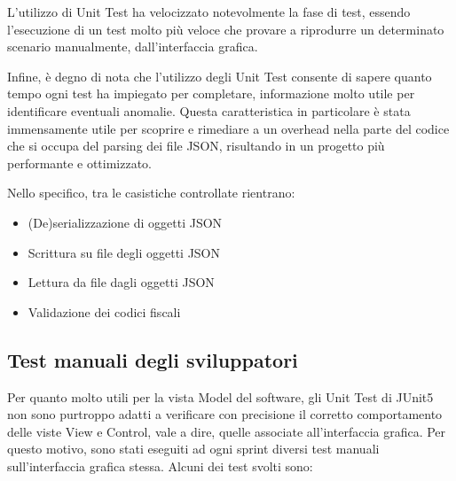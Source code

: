 \documentclass{article}
\begin{document}
L'utilizzo di Unit Test ha velocizzato notevolmente la fase di test, essendo l'esecuzione di un test molto più veloce che provare a riprodurre un determinato scenario manualmente, dall'interfaccia grafica.

Infine, è degno di nota che l'utilizzo degli Unit Test consente di sapere quanto tempo ogni test ha impiegato per completare, informazione molto utile per identificare eventuali anomalie. Questa caratteristica in particolare è stata immensamente utile per scoprire e rimediare a un overhead nella parte del codice che si occupa del parsing dei file JSON, risultando in un progetto più performante e ottimizzato.

Nello specifico, tra le casistiche controllate rientrano:

\begin{itemize}
    \item (De)serializzazione di oggetti JSON
    \item Scrittura su file degli oggetti JSON
    \item Lettura da file dagli oggetti JSON
    \item Validazione dei codici fiscali
\end{itemize}

\subsection{Test manuali degli sviluppatori}

Per quanto molto utili per la vista Model del software, gli Unit Test di JUnit5 non sono purtroppo adatti a verificare con precisione il corretto comportamento delle viste View e Control, vale a dire, quelle associate all'interfaccia grafica. Per questo motivo, sono stati eseguiti ad ogni sprint diversi test manuali sull'interfaccia grafica stessa. Alcuni dei test svolti sono:
\end{document}
